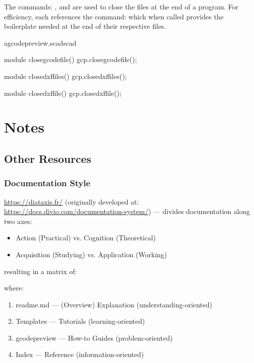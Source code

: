 \documentclass{ltxdoc}
\begin{document}
The commands: , and  are used to close the files at the end of a program. For efficiency, each references the command:  which when called provides the boilerplate needed at the end of their respective files.

\lstset{firstnumber=\thegcpscad}
\begin{writecode}{a}{gcodepreview.scad}{scad}

module closegcodefile(){
    gcp.closegcodefile();
}

module closedxffiles(){
    gcp.closedxffiles();
}

module closedxffile(){
    gcp.closedxffile();
}

\end{writecode}
\addtocounter{gcpscad}{50}

\section{Notes}

\subsection*{Other Resources}

\subsubsection*{Documentation Style}
 
\url{https://diataxis.fr/} (originally developed at: \url{https://docs.divio.com/documentation-system/}) --- divides documentation along two axes:

\begin{itemize}
\item Action (Practical) vs. Cognition (Theoretical)
\item Acquisition (Studying) vs. Application (Working)
\end{itemize}

\noindent resulting in a matrix of:



\noindent where:

\begin{enumerate}
\item readme.md --- (Overview) Explanation (understanding-oriented) %
\item Templates --- Tutorials (learning-oriented)
\item gcodepreview --- How-to Guides (problem-oriented)
\item Index --- Reference (information-oriented)
\end{enumerate}
\end{document}
